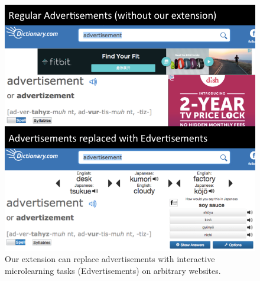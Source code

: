 \documentclass{sigchi}
\begin{document}
\begin{figure}
\includegraphics[width=\columnwidth]{edvertisements-screenshot4.png}
\caption{Our extension can replace advertisements with interactive microlearning tasks (Edvertisements) on arbitrary websites.}
\label{fig:edvertisements}
\end{figure}
\end{document}

